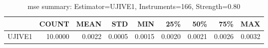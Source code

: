 \begin{table}[ht]
\centering
\caption{mse summary: Estimator=UJIVE1, Instruments=166, Strength=0.80}
\begin{tabular}{lrrrrrrrr}
\toprule
 & COUNT & MEAN & STD & MIN & 25\% & 50\% & 75\% & MAX \\
\midrule
UJIVE1 & 10.0000 & 0.0022 & 0.0005 & 0.0015 & 0.0020 & 0.0021 & 0.0026 & 0.0032 \\
\bottomrule
\end{tabular}
\end{table}
